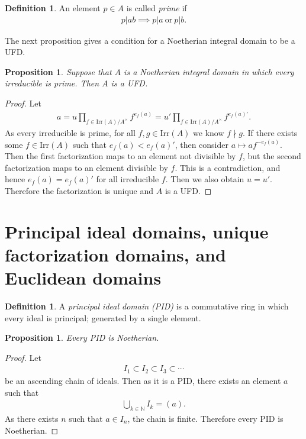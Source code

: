 \documentclass[12pt]{report}
\theoremstyle{plain}
\newtheorem{proposition}[theorem]{Proposition}
\theoremstyle{remark}
\theoremstyle{definition}
\newtheorem{definition}[theorem]{Definition}
\newcommand{\N}{\mathbb{N}}
\begin{document}
\begin{definition}
    An element $p\in A$ is called \emph{prime} if
    \begin{align*}
        p|ab \implies p|a \mathrm{~or~} p|b.
    \end{align*}
\end{definition}

The next proposition gives a condition for a Noetherian integral domain to be a UFD.

\begin{proposition}\label{Proposition 2.6.7.}
    Suppose that $A$ is a Noetherian integral domain in which every irreducible is prime. Then $A$ is a UFD.
\end{proposition}
\begin{proof}
    Let
    \begin{align*}
        a = u\prod_{f\in \mathrm{Irr}(A)/A^\times} f^{e_f(a)} = u'\prod_{f\in \mathrm{Irr}(A)/A^\times} f^{e_f(a)'}.
    \end{align*}
    As every irreducible is prime, for all $f,g\in\mathrm{Irr}(A)$ we know $f\nmid g$. If there exists some $f\in\mathrm{Irr}(A)$ such that $e_f(a)<e_f(a)'$, then consider $a\mapsto af^{-e_f(a)}$. Then the first factorization maps to an element not divisible by $f$, but the second factorization maps to an element divisible by $f$. This is a contradiction, and hence $e_f(a) = e_f(a)'$ for all irreducible $f$. Then we also obtain $u=u'$. Therefore the factorization is unique and $A$ is a UFD.
\end{proof}


\clearpage
\section{Principal ideal domains, unique factorization domains, and Euclidean domains}
\begin{definition}
    A \emph{principal ideal domain (PID)} is a commutative ring in which every ideal is principal; generated by a single element.
\end{definition}

\begin{proposition}\label{Proposition 2.7.2.}
    Every PID is Noetherian.
\end{proposition}
\begin{proof}
    Let
    \begin{align*}
        I_1\subset I_2\subset I_3\subset\cdots
    \end{align*}
    be an ascending chain of ideals. Then as it is a PID, there exists an element $a$ such that
    \begin{align*}
        \bigcup_{k\in\N} I_k = (a).
    \end{align*}
    As there exists $n$ such that $a\in I_n$, the chain is finite. Therefore every PID is Noetherian.
\end{proof}
\end{document}
